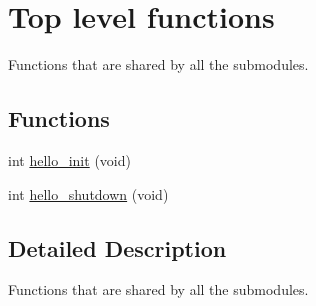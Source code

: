 \hypertarget{group__toplevel}{\section{Top level functions}
\label{group__toplevel}
}


Functions that are shared by all the submodules.  


\subsection*{Functions}
\begin{DoxyCompactItemize}
\item 
int \hyperlink{group__toplevel_ga5e2300911265c3c3237151925e65a201}{hello\-\_\-init} (void)
\item 
int \hyperlink{group__toplevel_gaf6fa684339b2f4b84c4ee4525131ae48}{hello\-\_\-shutdown} (void)
\end{DoxyCompactItemize}


\subsection{Detailed Description}
Functions that are shared by all the submodules. 

